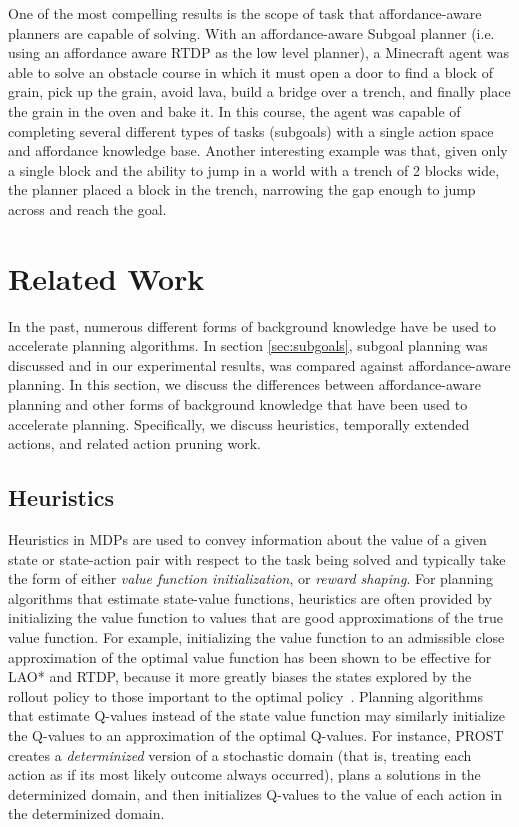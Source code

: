 \documentclass[]{article}
\begin{document}
One of the most compelling results is the scope of task that affordance-aware planners are capable of solving. With an affordance-aware Subgoal planner (i.e. using an affordance aware RTDP as the low level planner), a Minecraft agent was able to solve an obstacle course in which it must open a door to find a block of grain, pick up the grain, avoid lava, build a bridge over a trench, and finally place the grain in the oven and bake it. In this course, the agent was capable of completing several different types of tasks (subgoals) with a single action space and affordance knowledge base. Another interesting example was that, given only a single block and the ability to jump in a world with a trench of 2 blocks wide,
the planner placed a block in the trench, narrowing the gap enough to jump across and reach the goal.



\section{Related Work}
In the past, numerous different forms of background knowledge have be used to 
accelerate planning algorithms. In section \ref{sec:subgoals}, subgoal
planning was discussed and in our experimental results, was compared against affordance-aware planning. 
In this section, we discuss the differences between affordance-aware planning and other
forms of background knowledge that have been used to accelerate planning.
Specifically, we discuss heuristics, temporally extended actions, and related action pruning work.


\subsection{Heuristics}
Heuristics in MDPs are used to convey information about the value of a given state or state-action pair with respect to the task being solved and typically take the form of either {\em value function initialization},
or {\em reward shaping}. For planning algorithms that estimate state-value functions, heuristics are often
provided by initializing the value function to values that are good approximations of the true value function. For example, initializing the value function to an admissible close approximation of the optimal value function has been shown to be effective for LAO* and RTDP, because it more greatly biases the states explored by the rollout policy to those important to the optimal policy~\cite{Hansen:1999qf}. Planning algorithms that estimate Q-values instead of the state value function may similarly initialize the Q-values to an approximation of the optimal Q-values. For instance, PROST~\cite{keller2012prost} creates a {\em determinized} version of a stochastic domain (that is, treating each action as if its most likely outcome always occurred), plans a solutions in the determinized domain, and then initializes Q-values to the value of each action in the determinized domain.
\end{document}
